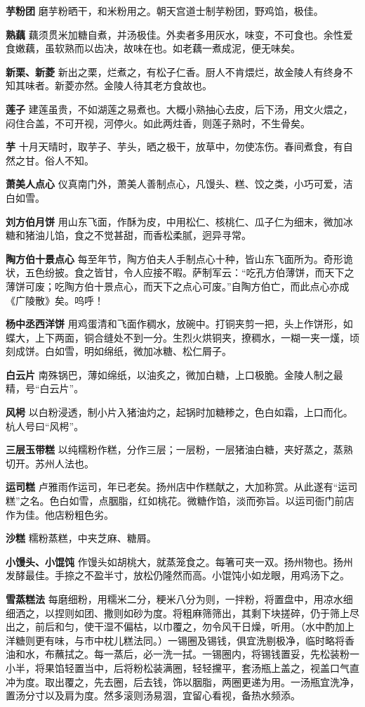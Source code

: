 \documentclass[]{article}
\begin{document}
\textbf{芋粉团}
磨芋粉晒干，和米粉用之。朝天宫道士制芋粉团，野鸡馅，极佳。

\textbf{熟藕}
藕须贯米加糖自煮，并汤极佳。外卖者多用灰水，味变，不可食也。余性爱食嫩藕，虽软熟而以齿决，故味在也。如老藕一煮成泥，便无味矣。

\textbf{新栗、新菱}
新出之栗，烂煮之，有松子仁香。厨人不肯煨烂，故金陵人有终身不知其味者。新菱亦然。金陵人待其老方食故也。

\textbf{莲子}
建莲虽贵，不如湖莲之易煮也。大概小熟抽心去皮，后下汤，用文火煨之，闷住合盖，不可开视，河停火。如此两炷香，则莲子熟时，不生骨矣。

\textbf{芋}
十月天晴时，取芋子、芋头，晒之极干，放草中，勿使冻伤。春间煮食，有自然之甘。俗人不知。

\textbf{萧美人点心}
仪真南门外，萧美人善制点心，凡馒头、糕、饺之类，小巧可爱，洁白如雪。

\textbf{刘方伯月饼}
用山东飞面，作酥为皮，中用松仁、核桃仁、瓜子仁为细末，微加冰糖和猪油儿馅，食之不觉甚甜，而香松柔腻，迥异寻常。

\textbf{陶方伯十景点心}
每至年节，陶方伯夫人手制点心十种，皆山东飞面所为。奇形诡状，五色纷披。食之皆甘，令人应接不暇。萨制军云：``吃孔方伯薄饼，而天下之薄饼可废；吃陶方伯十景点心，而天下之点心可废。''自陶方伯亡，而此点心亦成《广陵散》矣。呜呼！

\textbf{杨中丞西洋饼}
用鸡蛋清和飞面作稠水，放碗中。打铜夹剪一把，头上作饼形，如蝶大，上下两面，铜合缝处不到一分。生烈火烘铜夹，撩稠水，一糊一夹一熯，顷刻成饼。白如雪，明如绵纸，微加冰糖、松仁屑子。

\textbf{白云片}
南殊锅巴，薄如绵纸，以油炙之，微加白糖，上口极脆。金陵人制之最精，号``白云片''。

\textbf{风枵}
以白粉浸透，制小片入猪油灼之，起锅时加糖糁之，色白如霜，上口而化。杭人号曰``风枵''。

\textbf{三层玉带糕}
以纯糯粉作糕，分作三层；一层粉，一层猪油白糖，夹好蒸之，蒸熟切开。苏州人法也。

\textbf{运司糕}
卢雅雨作运司，年已老矣。扬州店中作糕献之，大加称赏。从此遂有``运司糕''之名。色白如雪，点胭脂，红如桃花。微糖作馅，淡而弥旨。以运司衙门前店作为佳。他店粉粗色劣。

\textbf{沙糕} 糯粉蒸糕，中夹芝麻、糖屑。

\textbf{小馒头、小馄饨}
作馒头如胡桃大，就蒸笼食之。每箸可夹一双。扬州物也。扬州发酵最佳。手捺之不盈半寸，放松仍隆然而高。小馄饨小如龙眼，用鸡汤下之。

\textbf{雪蒸糕法}
每磨细粉，用糯米二分，粳米八分为则，一拌粉，将置盘中，用凉水细细洒之，以捏则如团、撒则如砂为度。将粗麻筛筛出，其剩下块搓碎，仍于筛上尽出之，前后和匀，使干湿不偏枯，以巾覆之，勿令风干日燥，听用。（水中酌加上洋糖则更有味，与市中枕儿糕法同。）一锡圈及锡钱，俱宜洗剔极净，临时略将香油和水，布蘸拭之。每一蒸后，必一洗一拭。一锡圈内，将锡钱置妥，先松装粉一小半，将果馅轻置当中，后将粉松装满圈，轻轻攩平，套汤瓶上盖之，视盖口气直冲为度。取出覆之，先去圈，后去钱，饰以胭脂，两圈更递为用。一汤瓶宜洗净，置汤分寸以及肩为度。然多滚则汤易涸，宜留心看视，备热水频添。
\end{document}
